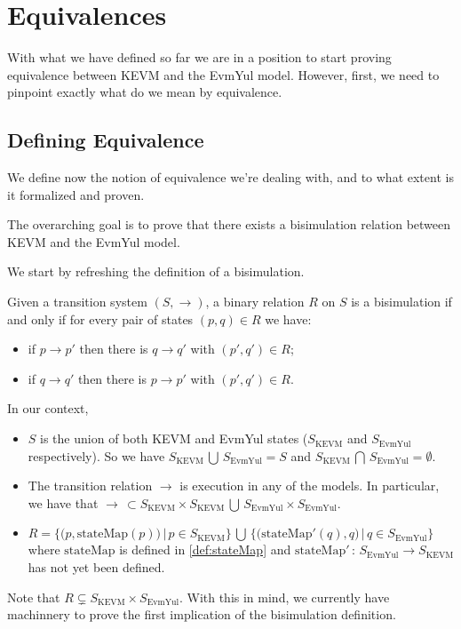 \chapter{Equivalences}\label{chap:equivalences}

With what we have defined so far we are in a position to start proving
equivalence between KEVM and the EvmYul model. However, first, we need to
pinpoint exactly what do we mean by equivalence.

\section{Defining Equivalence}

We define now the notion of equivalence we're dealing with, and to what extent
is it formalized and proven.

The overarching goal is to prove that there exists a bisimulation relation between
KEVM and the EvmYul model.

We start by refreshing the definition of a bisimulation.

\begin{definition}\label{def:bisimulation}
Given a transition system $(S, \rightarrow)$, a binary relation $R$ on $S$ is a
bisimulation if and only if for every pair of states $(p, q)\in R$ we have:
\begin{itemize}
\item if $p \rightarrow p'$ then there is $q \rightarrow q'$ with $(p', q') \in
  R$;
\item if $q \rightarrow q'$ then there is $p \rightarrow p'$ with $(p', q') \in
  R$.
\end{itemize}
\end{definition}

In our context,
\begin{itemize}
\item $S$ is the union of both KEVM and EvmYul states ($S_{\text{KEVM}}$ and
  $S_{\text{EvmYul}}$ respectively). So we have $S_{\text{KEVM}}\, \bigcup\, S_{\text{EvmYul}} = S$ and $S_{\text{KEVM}}\, \bigcap\, S_{\text{EvmYul}} = \emptyset$.
\item The transition relation $\rightarrow$ is execution in any of the models. In particular, we have that $\rightarrow\,
\subset S_{\text{KEVM}} \times S_{\text{KEVM}} \,\bigcup\, S_{\text{EvmYul}} \times S_{\text{EvmYul}}$.
\item $R = \bigl\{\bigl( p, \text{stateMap}(p) \bigr)\, |\, p\in S_{\text{KEVM}}\bigr\} \,\bigcup\, \bigl\{\bigl(\text{stateMap}'(q),
  q\bigr)\, |\, q\in S_{\text{EvmYul}}\bigr\}$ where $\text{stateMap}$ is
  defined in \ref{def:stateMap} and $\text{stateMap}'\,:\,
  S_{\text{EvmYul}}\rightarrow S_{\text{KEVM}}$ has not yet been defined.

\end{itemize}
Note that $R \subsetneq S_{\text{KEVM}}\times S_{\text{EvmYul}}$.
With this in mind, we currently have machinnery to prove the first implication
of the bisimulation definition.

